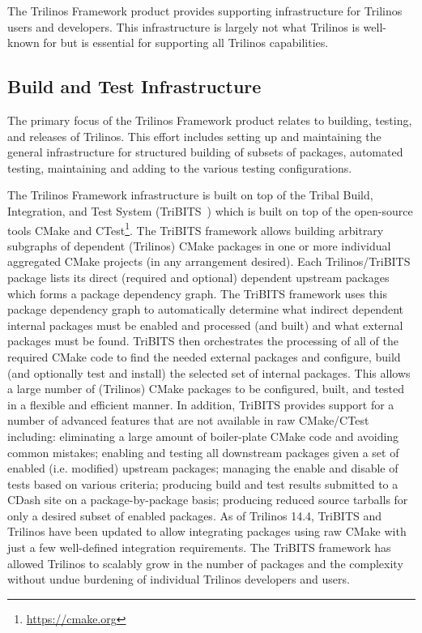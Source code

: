 
The Trilinos Framework product provides supporting infrastructure for Trilinos users and developers. This infrastructure is largely not what Trilinos is well-known for but is essential for supporting all Trilinos capabilities.

\subsection{Build and Test Infrastructure}

The primary focus of the Trilinos Framework product relates to building, testing, and releases of Trilinos. This effort includes setting up and maintaining the general infrastructure for structured building of subsets of packages, automated testing, maintaining and adding to the various testing configurations.

The Trilinos Framework infrastructure is built on top of the Tribal Build, Integration, and Test System (TriBITS~\cite{Bartlett2014}) which is built on top of the open-source tools CMake and CTest\footnote{\url{https://cmake.org}}.
The TriBITS framework allows building arbitrary subgraphs of dependent (Trilinos) CMake packages in one or more individual aggregated CMake projects (in any arrangement desired).
Each Trilinos/TriBITS package lists its direct (required and optional) dependent upstream packages which forms a package dependency graph.
The TriBITS framework uses this package dependency graph to automatically determine what indirect dependent internal packages must be enabled and processed (and built) and what external packages must be found.
TriBITS then orchestrates the processing of all of the required CMake code to find the needed external packages and configure, build (and optionally test and install) the selected set of internal packages.
This allows a large number of (Trilinos) CMake packages to be configured, built, and tested in a flexible and efficient manner.
In addition, TriBITS provides support for a number of advanced features that are not available in raw CMake/CTest including: eliminating a large amount of boiler-plate CMake code and avoiding common mistakes; enabling and testing all downstream packages given a set of enabled (i.e. modified) upstream packages; managing the enable and disable of tests based on various criteria; producing build and test results submitted to a CDash site on a package-by-package basis; producing reduced source tarballs for only a desired subset of enabled packages.
As of Trilinos 14.4, TriBITS and Trilinos have been updated to allow integrating packages using raw CMake with just a few well-defined integration requirements.
The TriBITS framework has allowed Trilinos to scalably grow in the number of packages and the complexity without undue burdening of individual Trilinos developers and users.

